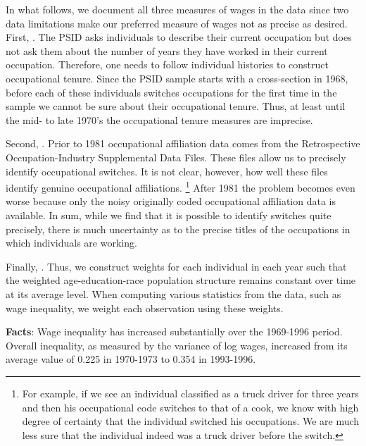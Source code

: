 \documentclass[12pt]{article}
\newcommand{\highlightB}[1]{{\emph{\color{MyBlue}{#1}}}}
\newcommand{\highlightP}[1]{{\emph{\color{MyPink}{#1}}}}
\theoremstyle{definition}
\begin{document}
In what follows, we document all three measures of wages in the data since two data limitations make our preferred \highlightB{Within-Group 2} measure of wages not as precise as desired. First, \highlightP{occupational tenure is not well measured in the early years of the sample}. The PSID asks individuals to describe their current occupation but does not ask them about the number of years they have worked in their current occupation. Therefore, one needs to follow individual histories to construct occupational tenure. Since the PSID sample starts with a cross-section in 1968, before each of these individuals switches occupations for the first time in the sample we cannot be sure about their occupational tenure. Thus, at least until the mid- to late 1970's the occupational tenure measures are imprecise.

Second, \highlightP{the three-digit occupational dummies are noisy, especially in the 1981-1997 period}. Prior to 1981 occupational affiliation data comes from the Retrospective Occupation-Industry Supplemental Data Files. These files allow us to precisely identify occupational switches. It is not clear, however, how well these files identify genuine occupational affiliations. \footnote{For example, if we see an individual classified as a truck driver for three years and then his occupational code switches to that of a cook, we know with high degree of certainty that the individual switched his occupations. We are much less sure that the individual indeed was a truck driver before the switch.} After 1981 the problem becomes even worse because only the noisy originally coded occupational affiliation data is available. In sum, while we find that it is possible to identify switches quite precisely, there is much uncertainty as to the precise titles of the occupations in which individuals are working.

Finally, \highlightP{the demographic structure of the population has been changing over time while it is not changing in the model}. Thus, we construct weights for each individual in each year such that the weighted age-education-race population structure remains constant over time at its average level. When computing various statistics from the data, such as wage inequality, we weight each observation using these weights. 

{\bf Facts}: Wage inequality has increased substantially over the 1969-1996 period. Overall inequality, as measured by the variance of log wages, increased from its average value of 0.225 in 1970-1973 to 0.354 in 1993-1996. 
\end{document}
